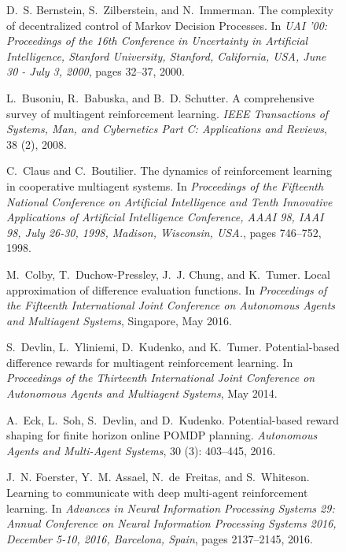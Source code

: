 \documentclass{article}
\begin{document}
\begin{SCfigure}
\begin{thebibliography}{40}
D.~S. Bernstein, S.~Zilberstein, and N.~Immerman.
\newblock The complexity of decentralized control of {Markov Decision
  Processes}.
\newblock In \emph{{UAI} '00: Proceedings of the 16th Conference in Uncertainty
  in Artificial Intelligence, Stanford University, Stanford, California, USA,
  June 30 - July 3, 2000}, pages 32--37, 2000.

L.~Busoniu, R.~Babuska, and B.~D. Schutter.
\newblock A comprehensive survey of multiagent reinforcement learning.
\newblock \emph{IEEE Transactions of Systems, Man, and Cybernetics Part C:
  Applications and Reviews}, 38 (2), 2008.

C.~Claus and C.~Boutilier.
\newblock The dynamics of reinforcement learning in cooperative multiagent
  systems.
\newblock In \emph{Proceedings of the Fifteenth National Conference on
  Artificial Intelligence and Tenth Innovative Applications of Artificial
  Intelligence Conference, {AAAI} 98, {IAAI} 98, July 26-30, 1998, Madison,
  Wisconsin, {USA.}}, pages 746--752, 1998.

M.~Colby, T.~Duchow-Pressley, J.~J. Chung, and K.~Tumer.
\newblock Local approximation of difference evaluation functions.
\newblock In \emph{Proceedings of the Fifteenth International Joint Conference
  on Autonomous Agents and Multiagent Systems}, Singapore, May 2016.

S.~Devlin, L.~Yliniemi, D.~Kudenko, and K.~Tumer.
\newblock Potential-based difference rewards for multiagent reinforcement
  learning.
\newblock In \emph{Proceedings of the Thirteenth International Joint Conference
  on Autonomous Agents and Multiagent Systems}, May 2014.

A.~Eck, L.~Soh, S.~Devlin, and D.~Kudenko.
\newblock Potential-based reward shaping for finite horizon online {POMDP}
  planning.
\newblock \emph{Autonomous Agents and Multi-Agent Systems}, 30
  (3): 403--445, 2016.

J.~N. Foerster, Y.~M. Assael, N.~de~Freitas, and S.~Whiteson.
\newblock Learning to communicate with deep multi-agent reinforcement learning.
\newblock In \emph{Advances in Neural Information Processing Systems 29: Annual
  Conference on Neural Information Processing Systems 2016, December 5-10,
  2016, Barcelona, Spain}, pages 2137--2145, 2016.


\end{thebibliography}
\end{SCfigure}
\end{document}

